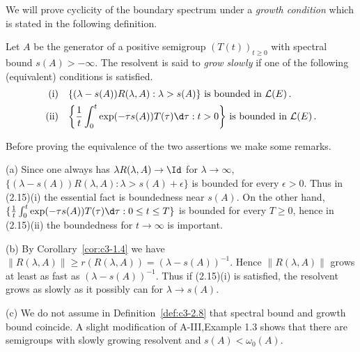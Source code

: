 We will prove cyclicity of the boundary spectrum under a \emph{growth condition} which is stated in the following definition.
%
%
\begin{definition}\label{def:c3-2.8}
	Let $A$ be the generator of a positive semigroup $(T(t))_{t \geq 0}$ with spectral bound $s(A) > -\infty$.
	The resolvent is said to \emph{grow slowly} if one of the following (equivalent) conditions is satisfied.
	\begin{equation}\label{eq:c3-2.15}
	\begin{aligned}
	\text{(i)}\quad & \text{$\{(\lambda-s(A))R(\lambda,A) : \lambda > s(A)\}$ is bounded in $\mathcal{L}(E)$}\,.\\
	\text{(ii)}\quad & \text{$\left\{\frac{1}{t} \int_{0}^{t} \exp(-\tau s(A))T(\tau) \d\tau : t > 0\right\}$ is bounded in $\mathcal{L}(E)$}\,.
	\end{aligned}
	\end{equation}
\end{definition}
Before proving the equivalence of the two assertions we make some remarks.

(a) Since one always has $\lambda R(\lambda,A) \to \Id$ for $\lambda \to \infty$, $\{(\lambda-s(A))R(\lambda,A) : \lambda > s(A)+\epsilon\}$ is bounded for every $\epsilon > 0$.
Thus in (2.15)(i) the essential fact is boundedness near $s(A)$.
On the other hand, $\{\frac{1}{t} \int_{0}^{t} \exp(-\tau s(A))T(\tau) \d\tau : 0 \leq t \leq T\}$ is bounded for every $T \geq 0$, hence in (2.15)(ii) the boundedness for $t \to \infty$ is important.

(b) By Corollary~\ref{cor:c3-1.4} we have $\|R(\lambda,A)\| \geq r(R(\lambda,A)) = (\lambda-s(A))^{-1}$.
Hence $\|R(\lambda,A)\|$ grows at least as fast as $(\lambda-s(A))^{-1}$.
Thus if (2.15)(i) is satisfied, the resolvent grows as slowly as it possibly can for $\lambda \to s(A)$.

(c) We do not assume in Definition~\ref{def:c3-2.8} that spectral bound and growth bound coincide.
A slight modification of A-III,Example 1.3 shows that there are semigroups with slowly growing resolvent and $s(A) < \omega_0(A)$.

